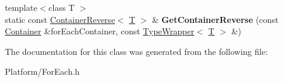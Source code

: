 \begin{DoxyCompactItemize}
\item 
\mbox{\label{class_gost_crypt_1_1_for_each_a54e2398dc82f7e83d66c53a3a1ed7ca9}} 
{\footnotesize template$<$class T $>$ }\\static const \hyperlink{struct_gost_crypt_1_1_for_each_1_1_container_reverse}{Container\+Reverse}$<$ \hyperlink{_stribog_8c_aba2f4c400d7a4c0bf0296be622087314}{T} $>$ \& {\bfseries Get\+Container\+Reverse} (const \hyperlink{struct_gost_crypt_1_1_for_each_1_1_container}{Container} \&for\+Each\+Container, const \hyperlink{struct_gost_crypt_1_1_for_each_1_1_type_wrapper}{Type\+Wrapper}$<$ \hyperlink{_stribog_8c_aba2f4c400d7a4c0bf0296be622087314}{T} $>$ \&)
\end{DoxyCompactItemize}


The documentation for this class was generated from the following file\+:\begin{DoxyCompactItemize}
\item 
Platform/For\+Each.\+h\end{DoxyCompactItemize}
